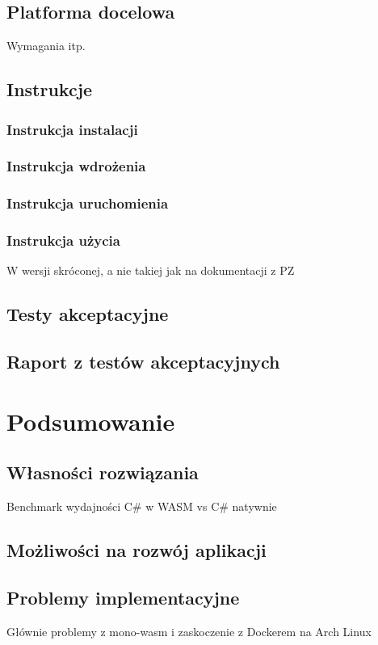 \documentclass[a4paper,11pt,twoside]{report}
\theoremstyle{definition}
\begin{document}
    \section{Platforma docelowa}
        Wymagania itp.
    
    \section{Instrukcje}
        \subsection{Instrukcja instalacji}
        \subsection{Instrukcja wdrożenia}
        \subsection{Instrukcja uruchomienia}
        \subsection{Instrukcja użycia}
            W wersji skróconej, a nie takiej jak na dokumentacji z PZ
    
    \section{Testy akceptacyjne}
    
    \section{Raport z testów akceptacyjnych}

\chapter{Podsumowanie}
    \section{Własności rozwiązania}
        Benchmark wydajności C\# w WASM vs C\# natywnie
    
    \section{Możliwości na rozwój aplikacji}
    
    \section{Problemy implementacyjne}
        Głównie problemy z mono-wasm i zaskoczenie z Dockerem na Arch Linux
    
\end{document}
